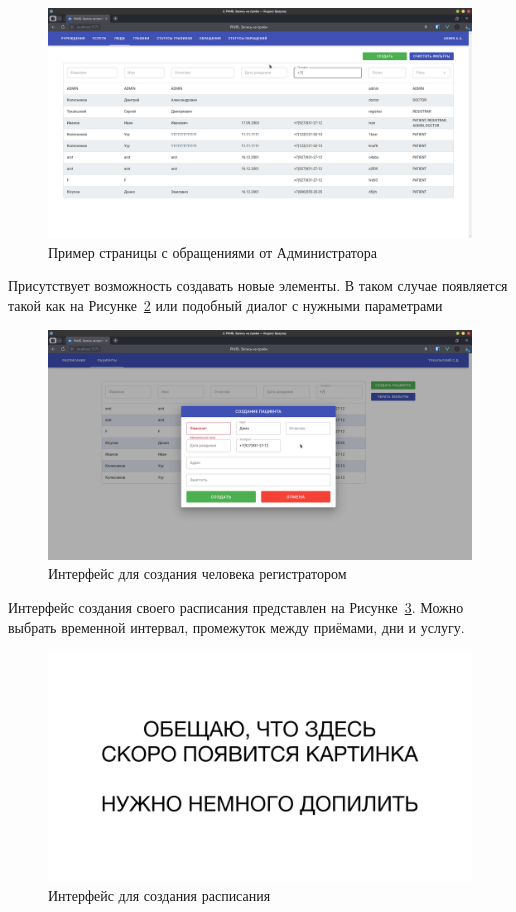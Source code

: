 \documentclass[a4paper,article]{article}
\begin{document}
\begin{sloppypar}
    \begin{figure}[h]
        \centering
        \includegraphics[width=0.8\linewidth]{UI. Обращения от ADMIN.png}        
        \caption{\centering Пример страницы с обращениями от Администратора}        
        \label{fig:uiappointment}        
    \end{figure}
    
    \newpage
    
    Присутствует возможность создавать новые элементы. В таком случае появляется такой как на Рисунке~\ref{fig:uiadd} или подобный диалог с нужными параметрами
    
    \begin{figure}[h]
        \centering
        \includegraphics[width=0.8\linewidth]{UI. Создание человека.png}        
        \caption{\centering Интерфейс для создания человека регистратором}        
        \label{fig:uiadd}        
    \end{figure}
    
    Интерфейс создания своего расписания представлен на Рисунке~\ref{fig:createsched}. Можно выбрать временной интервал, промежуток между приёмами, дни и услугу.
    
    \begin{figure}[h]
        \centering
        \includegraphics[width=0.8\linewidth]{UI. Пример создания расписания.png}        
        \caption{\centering Интерфейс для создания расписания}        
        \label{fig:createsched}        
    \end{figure}
    

\end{sloppypar}
\end{document}
